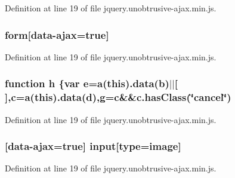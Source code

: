 Definition at line 19 of file jquery.\+unobtrusive-\/ajax.\+min.\+js.

\hypertarget{jquery_8unobtrusive-ajax_8min_8js_aee46ca1cc1ea003c231a9cbd535599d0}{}
\subsubsection[{form}]{\setlength{\rightskip}{0pt plus 5cm}form\mbox{[}{\bf data}-\/{\bf ajax}=true\mbox{]}}\label{jquery_8unobtrusive-ajax_8min_8js_aee46ca1cc1ea003c231a9cbd535599d0}


Definition at line 19 of file jquery.\+unobtrusive-\/ajax.\+min.\+js.

\hypertarget{jquery_8unobtrusive-ajax_8min_8js_a7ddc97992591bc8a855e841ba3ee5d32}{}
\subsubsection[{h}]{\setlength{\rightskip}{0pt plus 5cm}function h \{var {\bf e}={\bf a}(this).{\bf data}({\bf b})$\vert$$\vert$\mbox{[}$\,$\mbox{]},{\bf c}={\bf a}(this).{\bf data}({\bf d}),{\bf g}={\bf c}\&\&{\bf c.\+has\+Class}(\char`\"{}cancel\char`\"{})}\label{jquery_8unobtrusive-ajax_8min_8js_a7ddc97992591bc8a855e841ba3ee5d32}


Definition at line 19 of file jquery.\+unobtrusive-\/ajax.\+min.\+js.

\hypertarget{jquery_8unobtrusive-ajax_8min_8js_a22211e450825dd03852dfba097324407}{}
\subsubsection[{input}]{ \mbox{[}{\bf data}-\/{\bf ajax}=true\mbox{]} input\mbox{[}type=image\mbox{]}}\label{jquery_8unobtrusive-ajax_8min_8js_a22211e450825dd03852dfba097324407}


Definition at line 19 of file jquery.\+unobtrusive-\/ajax.\+min.\+js.

